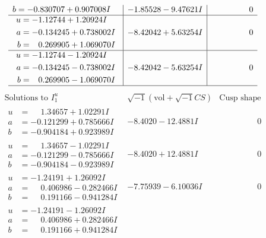 \documentclass[1p]{elsarticle_modified}
\theoremstyle{definition}
\newcommand{\I}{\sqrt{-1}}
\begin{document}
$$\begin{array}{c|c|c}
\begin{aligned}
b &= -0.830707 + 0.907008 I\end{aligned}
 & -1.85528 - 9.47621 I & \phantom{-0.000000 } 0 \\ \hline\begin{aligned}
u &= -1.12744 + 1.20924 I \\
a &= -0.134245 + 0.738002 I \\
b &= \phantom{-}0.269905 + 1.069070 I\end{aligned}
 & -8.42042 + 5.63254 I & \phantom{-0.000000 } 0 \\ \hline\begin{aligned}
u &= -1.12744 - 1.20924 I \\
a &= -0.134245 - 0.738002 I \\
b &= \phantom{-}0.269905 - 1.069070 I\end{aligned}
 & -8.42042 - 5.63254 I & \phantom{-0.000000 } 0\\
 \hline 
 \end{array}$$\newpage$$\begin{array}{c|c|c}  
\text{Solutions to }I^u_{1}& \I (\text{vol} + \sqrt{-1}CS) & \text{Cusp shape}\\
 \hline 
\begin{aligned}
u &= \phantom{-}1.34657 + 1.02291 I \\
a &= -0.121299 + 0.785666 I \\
b &= -0.904184 + 0.923989 I\end{aligned}
 & -8.4020 - 12.4881 I & \phantom{-0.000000 } 0 \\ \hline\begin{aligned}
u &= \phantom{-}1.34657 - 1.02291 I \\
a &= -0.121299 - 0.785666 I \\
b &= -0.904184 - 0.923989 I\end{aligned}
 & -8.4020 + 12.4881 I & \phantom{-0.000000 } 0 \\ \hline\begin{aligned}
u &= -1.24191 + 1.26092 I \\
a &= \phantom{-}0.406986 - 0.282466 I \\
b &= \phantom{-}0.191166 - 0.941284 I\end{aligned}
 & -7.75939 - 6.10036 I & \phantom{-0.000000 } 0 \\ \hline\begin{aligned}
u &= -1.24191 - 1.26092 I \\
a &= \phantom{-}0.406986 + 0.282466 I \\
b &= \phantom{-}0.191166 + 0.941284 I\end{aligned}

\end{array}$$
\end{document}
